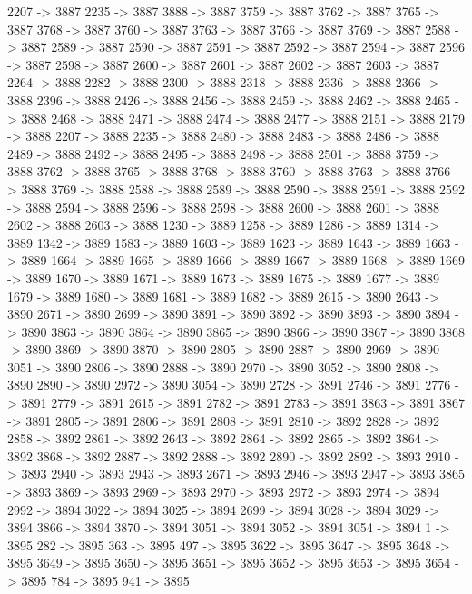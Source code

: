 {	2207 -> 3887
	2235 -> 3887
	3888 -> 3887
	3759 -> 3887
	3762 -> 3887
	3765 -> 3887
	3768 -> 3887
	3760 -> 3887
	3763 -> 3887
	3766 -> 3887
	3769 -> 3887
	2588 -> 3887
	2589 -> 3887
	2590 -> 3887
	2591 -> 3887
	2592 -> 3887
	2594 -> 3887
	2596 -> 3887
	2598 -> 3887
	2600 -> 3887
	2601 -> 3887
	2602 -> 3887
	2603 -> 3887
	2264 -> 3888
	2282 -> 3888
	2300 -> 3888
	2318 -> 3888
	2336 -> 3888
	2366 -> 3888
	2396 -> 3888
	2426 -> 3888
	2456 -> 3888
	2459 -> 3888
	2462 -> 3888
	2465 -> 3888
	2468 -> 3888
	2471 -> 3888
	2474 -> 3888
	2477 -> 3888
	2151 -> 3888
	2179 -> 3888
	2207 -> 3888
	2235 -> 3888
	2480 -> 3888
	2483 -> 3888
	2486 -> 3888
	2489 -> 3888
	2492 -> 3888
	2495 -> 3888
	2498 -> 3888
	2501 -> 3888
	3759 -> 3888
	3762 -> 3888
	3765 -> 3888
	3768 -> 3888
	3760 -> 3888
	3763 -> 3888
	3766 -> 3888
	3769 -> 3888
	2588 -> 3888
	2589 -> 3888
	2590 -> 3888
	2591 -> 3888
	2592 -> 3888
	2594 -> 3888
	2596 -> 3888
	2598 -> 3888
	2600 -> 3888
	2601 -> 3888
	2602 -> 3888
	2603 -> 3888
	1230 -> 3889
	1258 -> 3889
	1286 -> 3889
	1314 -> 3889
	1342 -> 3889
	1583 -> 3889
	1603 -> 3889
	1623 -> 3889
	1643 -> 3889
	1663 -> 3889
	1664 -> 3889
	1665 -> 3889
	1666 -> 3889
	1667 -> 3889
	1668 -> 3889
	1669 -> 3889
	1670 -> 3889
	1671 -> 3889
	1673 -> 3889
	1675 -> 3889
	1677 -> 3889
	1679 -> 3889
	1680 -> 3889
	1681 -> 3889
	1682 -> 3889
	2615 -> 3890
	2643 -> 3890
	2671 -> 3890
	2699 -> 3890
	3891 -> 3890
	3892 -> 3890
	3893 -> 3890
	3894 -> 3890
	3863 -> 3890
	3864 -> 3890
	3865 -> 3890
	3866 -> 3890
	3867 -> 3890
	3868 -> 3890
	3869 -> 3890
	3870 -> 3890
	2805 -> 3890
	2887 -> 3890
	2969 -> 3890
	3051 -> 3890
	2806 -> 3890
	2888 -> 3890
	2970 -> 3890
	3052 -> 3890
	2808 -> 3890
	2890 -> 3890
	2972 -> 3890
	3054 -> 3890
	2728 -> 3891
	2746 -> 3891
	2776 -> 3891
	2779 -> 3891
	2615 -> 3891
	2782 -> 3891
	2783 -> 3891
	3863 -> 3891
	3867 -> 3891
	2805 -> 3891
	2806 -> 3891
	2808 -> 3891
	2810 -> 3892
	2828 -> 3892
	2858 -> 3892
	2861 -> 3892
	2643 -> 3892
	2864 -> 3892
	2865 -> 3892
	3864 -> 3892
	3868 -> 3892
	2887 -> 3892
	2888 -> 3892
	2890 -> 3892
	2892 -> 3893
	2910 -> 3893
	2940 -> 3893
	2943 -> 3893
	2671 -> 3893
	2946 -> 3893
	2947 -> 3893
	3865 -> 3893
	3869 -> 3893
	2969 -> 3893
	2970 -> 3893
	2972 -> 3893
	2974 -> 3894
	2992 -> 3894
	3022 -> 3894
	3025 -> 3894
	2699 -> 3894
	3028 -> 3894
	3029 -> 3894
	3866 -> 3894
	3870 -> 3894
	3051 -> 3894
	3052 -> 3894
	3054 -> 3894
	1 -> 3895
	282 -> 3895
	363 -> 3895
	497 -> 3895
	3622 -> 3895
	3647 -> 3895
	3648 -> 3895
	3649 -> 3895
	3650 -> 3895
	3651 -> 3895
	3652 -> 3895
	3653 -> 3895
	3654 -> 3895
	784 -> 3895
	941 -> 3895
}
